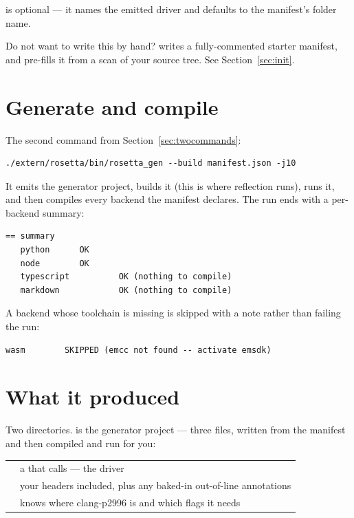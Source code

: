  is optional --- it names the emitted driver and
defaults to the manifest's folder name.

\begin{note}
Do not want to write this by hand?  writes a
fully-commented starter manifest, and  pre-fills it from a scan of your source tree.
See Section~\ref{sec:init}.
\end{note}

\section{Generate and compile}

The second command from Section~\ref{sec:twocommands}:

\begin{lstlisting}[style=sh]
./extern/rosetta/bin/rosetta_gen --build manifest.json -j10
\end{lstlisting}

It emits the generator project, builds it (this is where reflection runs), runs
it, and then compiles every backend the manifest declares. The run ends with a
per-backend summary:

\begin{lstlisting}[style=plain]
== summary
   python      OK
   node        OK
   typescript          OK (nothing to compile)
   markdown            OK (nothing to compile)
\end{lstlisting}

A backend whose toolchain is missing is skipped with a note rather than failing
the run:

\begin{lstlisting}[style=plain]
   wasm        SKIPPED (emcc not found -- activate emsdk)
\end{lstlisting}

\section{What it produced}

Two directories.  is the generator project --- three files, written
from the manifest and then compiled and run for you:

\begin{center}
\small
\begin{tabular}{@{}lL{9.2cm}@{}}
\toprule
{} & a  that calls
   --- the driver \\
 & your headers included, plus any baked-in out-of-line
  annotations \\
 & knows where clang-p2996 is and which flags it needs \\
\bottomrule
\end{tabular}
\end{center}

